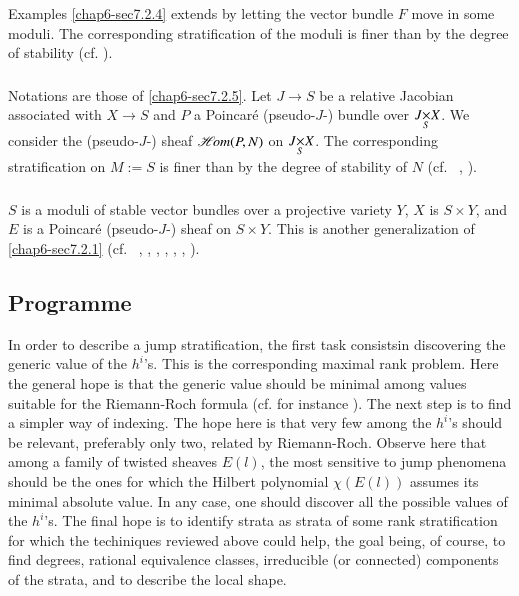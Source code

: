 \subsubsection{}\label{chap6-sec7.4.3}
Examples \ref{chap6-sec7.2.4} extends by letting the vector bundle $F$
move in some moduli. The corresponding stratification of the moduli is
finer than by the degree of stability (cf. \cite{chap6-LN}).

\subsubsection{}\label{chap6-sec7.4.4}
Notations are those of \ref{chap6-sec7.2.5}. Let $J\to S$ be a
relative Jacobian associated with $X\to S$ and $P$ a Poincar\'e
(pseudo-$J$-) bundle over $\fprod{J}{X}{S}$. We consider the
(pseudo-$J$-) sheaf $\operatorname{\it\mathscr{H}\!om}(P,N)$ on $\fprod{J}{X}{S}$. The
corresponding stratification on $M:=S$ is finer than by the degree of
stability of $N$ (cf.~ \cite{chap6-S2}, \cite{chap6-Ne}).

\subsubsection{}\label{chap6-sec7.4.5}
$S$ is a moduli of stable vector bundles over a projective variety
$Y$, $X$ is $S\times Y$, and $E$ is a Poincar\'e (pseudo-$J$-) sheaf
on $S\times Y$. This is another generalization of \ref{chap6-sec7.2.1}
(cf.~ \cite{chap6-B3}, \cite{chap6-H2}, \cite{chap6-H4}, \cite{chap6-Bru}, \cite{chap6-L1}, \cite{chap6-HH2}, \cite{chap6-BH3}). 

\subsection{Programme}\label{chap6-sec7.5}

In order to describe a jump stratification, the first task
consists\pageoriginale in discovering the generic value of the
$h^{i}$'s. This is the corresponding maximal rank problem. Here the
general hope is that the generic value should be minimal among values
suitable for the Riemann-Roch formula (cf. for
instance \cite{chap6-BH3}). The next step is to find a simpler way of
indexing. The hope here is that very few among the $h^{i}$'s should be
relevant, preferably only two, related by Riemann-Roch. Observe here
that among a family of twisted sheaves $E(l)$, the most sensitive to
jump phenomena should be the ones for which the Hilbert polynomial
$\chi(E(l))$ assumes its minimal absolute value. In any case, one
should discover all the possible values of the $h^{i}$'s. The final
hope is to identify strata as strata of some rank stratification for
which the techiniques reviewed above could help, the goal being, of
course, to find degrees, rational equivalence classes, irreducible (or
connected) components of the strata, and to describe the local shape.

